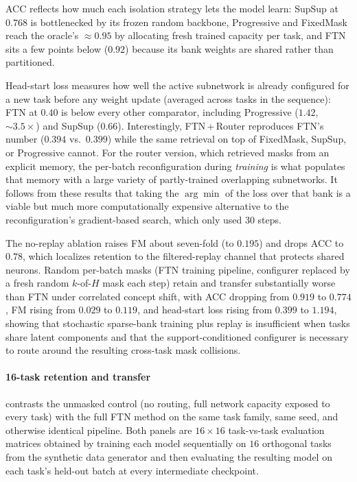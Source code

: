 \documentclass[11pt]{article}
\begin{document}
ACC reflects how much each isolation strategy lets the model learn: SupSup at $0.768$ is bottlenecked by its frozen random backbone, Progressive and FixedMask reach the oracle's $\approx 0.95$ by allocating fresh trained capacity per task, and FTN sits a few points below ($0.92$) because its bank weights are shared rather than partitioned.

Head-start loss measures how well the active subnetwork is already configured for a new task before any weight update (averaged across tasks in the sequence): FTN at $0.40$ is below every other comparator, including Progressive ($1.42$, ${\sim}3.5\times$) and SupSup ($0.66$).
Interestingly, FTN\,+\,Router reproduces FTN's number ($0.394$ vs.\ $0.399$) while the same retrieval on top of FixedMask, SupSup, or Progressive cannot.
For the router version, which retrieved masks from an explicit memory, the per-batch reconfiguration during \emph{training} is what populates that memory with a large variety of partly-trained overlapping subnetworks. It follows from these results that taking the $\arg\min$ of the loss over that bank is a viable but much more computationally expensive alternative to the reconfiguration's gradient-based search, which only used 30 steps.

The no-replay ablation raises FM about seven-fold (to $0.195$) and drops ACC to $0.78$, which localizes retention to the filtered-replay channel that protects shared neurons. Random per-batch masks (FTN training pipeline, configurer replaced by a fresh random $k$-of-$H$ mask each step) retain and transfer substantially worse than FTN under correlated concept shift, with ACC dropping from $0.919$ to $0.774$, FM rising from $0.029$ to $0.119$, and head-start loss rising from $0.399$ to $1.194$, showing that stochastic sparse-bank training plus replay is insufficient when tasks share latent components and that the support-conditioned configurer is necessary to route around the resulting cross-task mask collisions.



\paragraph{16-task retention and transfer}\label{null_vs_full}

 contrasts the unmasked control (no routing, full network capacity exposed to every task) with the full FTN method on the same task family, same seed, and otherwise identical pipeline. Both panels are $16\times 16$ task-vs-task evaluation matrices obtained by training each model sequentially on $16$ orthogonal tasks from the synthetic data generator and then evaluating the resulting model on each task's held-out batch at every intermediate checkpoint.
\end{document}

